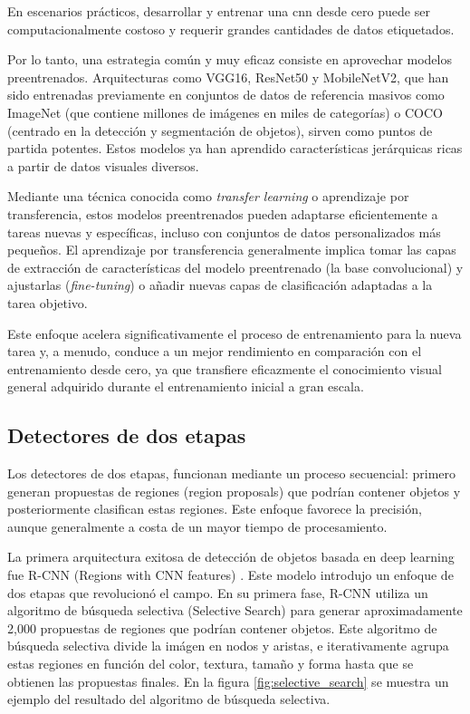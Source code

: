 \documentclass[11pt,spanish,listoffigures,listoftables]{tfgetsinf}
\begin{document}
En escenarios prácticos, desarrollar y entrenar una \gls{cnn} desde cero puede ser computacionalmente costoso y requerir grandes cantidades de datos etiquetados.

Por lo tanto, una estrategia común y muy eficaz consiste en aprovechar modelos preentrenados. Arquitecturas como VGG16, ResNet50 y MobileNetV2, que han sido entrenadas previamente en conjuntos de datos de referencia masivos como ImageNet (que contiene millones de imágenes en miles de categorías) o COCO (centrado en la detección y segmentación de objetos), sirven como puntos de partida potentes. Estos modelos ya han aprendido características jerárquicas ricas a partir de datos visuales diversos.

Mediante una técnica conocida como \textit{transfer learning} o aprendizaje por transferencia, estos modelos preentrenados pueden adaptarse eficientemente a tareas nuevas y específicas, incluso con conjuntos de datos personalizados más pequeños. El aprendizaje por transferencia generalmente implica tomar las capas de extracción de características del modelo preentrenado (la base convolucional) y ajustarlas (\textit{fine-tuning}) o añadir nuevas capas de clasificación adaptadas a la tarea objetivo.

Este enfoque acelera significativamente el proceso de entrenamiento para la nueva tarea y, a menudo, conduce a un mejor rendimiento en comparación con el entrenamiento desde cero, ya que transfiere eficazmente el conocimiento visual general adquirido durante el entrenamiento inicial a gran escala.





\subsection{Detectores de dos etapas} \label{sec:two_stage_detectors}
Los detectores de dos etapas, funcionan mediante un proceso secuencial: primero generan propuestas de regiones (region proposals) que podrían contener objetos y posteriormente clasifican estas regiones. Este enfoque favorece la precisión, aunque generalmente a costa de un mayor tiempo de procesamiento.

La primera arquitectura exitosa de detección de objetos basada en deep learning fue R-CNN (Regions with CNN features) \cite{girshick2014richfeaturehierarchiesaccurate}. Este modelo introdujo un enfoque de dos etapas que revolucionó el campo. En su primera fase, R-CNN utiliza un algoritmo de búsqueda selectiva (Selective Search) para generar aproximadamente 2,000 propuestas de regiones que podrían contener objetos. Este algoritmo de búsqueda selectiva divide la imágen en nodos y aristas, e iterativamente agrupa estas regiones en función del color, textura, tamaño y forma hasta que se obtienen las propuestas finales. En la figura \ref{fig:selective_search} se muestra un ejemplo del resultado del algoritmo de búsqueda selectiva.
\end{document}
